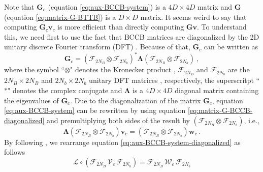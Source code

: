 \documentclass[utf8]{FrontiersinHarvard} %
\begin{document}
	Note that $\mathbf{G}_{c}$ (equation \ref{eq:aux-BCCB-system}) is a $4D \times 4D$ matrix and 
	$\mathbf{G}$ (equation \ref{eq:matrix-G-BTTB}) is a $D \times D$ matrix.
	It seems weird to say that computing $\mathbf{G}_{c} \mathbf{v}_{c}$ is more efficient
	than directly computing $\mathbf{G} \mathbf{v}$. To understand this, we need first to use the fact that
	BCCB matrices are diagonalized by the 2D unitary discrete Fourier transform (DFT) \citep[e.g.,][ p. 31]{davis1979}.
	Because of that, $\mathbf{G}_{c}$ can be written as
	\begin{equation}
		\mathbf{G}_{c} = 
		\left(\boldsymbol{\mathcal{F}}_{2N_{B}} \otimes \boldsymbol{\mathcal{F}}_{2N_{b}} \right)^{\ast} 
		\boldsymbol{\Lambda}
		\left(\boldsymbol{\mathcal{F}}_{2N_{B}} \otimes \boldsymbol{\mathcal{F}}_{2N_{b}} \right) \: ,
		\label{eq:matrix-G-BCCB-diagonalized}
	\end{equation}
	where the symbol ``$\otimes$" denotes the Kronecker product \cite[e.g.,][p. 243]{horn-johnson1991},
	$\boldsymbol{\mathcal{F}}_{2N_{B}}$ and $\boldsymbol{\mathcal{F}}_{2N_{b}}$ are the $2N_{B} \times 2N_{B}$ and $2N_{b} \times 2N_{b}$ 
	unitary DFT matrices \citep[e.g.,][ p. 31]{davis1979}, respectively, the superscritpt 
	``$\ast$" denotes the complex conjugate and $\boldsymbol{\Lambda}$ is a 
	$4D \times 4D$ diagonal matrix containing the eigenvalues of $\mathbf{G}_{c}$.
	Due to the diagonalization of the matrix $\mathbf{G}_{c}$, 
	equation \ref{eq:aux-BCCB-system} can be rewritten by using equation 
	\ref{eq:matrix-G-BCCB-diagonalized} and premultiplying both sides of the result 
	by $\left(\boldsymbol{\mathcal{F}}_{2N_{B}} \otimes \boldsymbol{\mathcal{F}}_{2N_{b}} \right)$, i.e.,
	\begin{equation}
		\boldsymbol{\Lambda} \left(\boldsymbol{\mathcal{F}}_{2N_{B}} \otimes \boldsymbol{\mathcal{F}}_{2N_{b}} \right) 
		\mathbf{v}_{c} = \left(\boldsymbol{\mathcal{F}}_{2N_{B}} \otimes \boldsymbol{\mathcal{F}}_{2N_{b}} \right) 
		\mathbf{w}_{c} \: .
		\label{eq:aux-BCCB-system-diagonalized}
	\end{equation}
	By following \citet{takahashi-etal2020}, we rearrange equation \ref{eq:aux-BCCB-system-diagonalized} as follows
	\begin{equation}
		\boldsymbol{\mathcal{L}} \circ 
		\left( \boldsymbol{\mathcal{F}}_{2N_{B}} \, \boldsymbol{\mathcal{V}}_{c} \, \boldsymbol{\mathcal{F}}_{2N_{b}} \right) = 
		\boldsymbol{\mathcal{F}}_{2N_{B}} \, \boldsymbol{\mathcal{W}}_{c} \, \boldsymbol{\mathcal{F}}_{2N_{b}}
		\label{eq:aux-BCCB-system-diagonalized-2}
	\end{equation}
\end{document}
